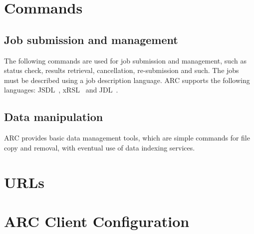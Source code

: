 \documentclass{book}
\begin{document}
\chapter{Commands} \label{sec:cli} 

\section{Job submission and management} \label{sec:ui} 
The following commands are used for job submission and management,
such as status check, results retrieval, cancellation, re-submission
and such. The jobs must be described using a job description language. ARC
supports the following languages: JSDL~\cite{jsdl}, xRSL~\cite{xrsl} and
JDL~\cite{jdl}.



\section{Data manipulation} \label{sec:dm} 
 ARC provides basic data management tools,
which are simple commands for file copy and removal, with eventual use
of data indexing services.



%

%


\chapter{URLs}\label{sec:urls}


\chapter{ARC Client Configuration} \label{sec:client.conf} 



\printindex
\end{document}
